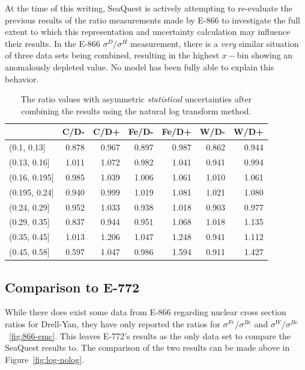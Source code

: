 At the time of this writing, SeaQuest is actively attempting to re-evaluate the previous results of the ratio measurements made by E-866 to investigate the full extent to which this representation and uncertainty calculation may influence their results. In the E-866 $\sigma^D/\sigma^H$ measurement, there is a \emph{very} similar situation of three data sets being combined, resulting in the highest $x-$bin showing an anomalously depleted value. No model has been fully able to explain this behavior.

\begin{table}
	\centering
	\begin{tabular}{lrrrrrr}
		\toprule
		{} &   C/D- &   C/D+ &  Fe/D- &  Fe/D+ &   W/D- &   W/D+ \\
		\midrule
		(0.1, 0.13]   &  0.878 &  0.967 &  0.897 &  0.987 &  0.862 &  0.944 \\
		(0.13, 0.16]  &  1.011 &  1.072 &  0.982 &  1.041 &  0.941 &  0.994 \\
		(0.16, 0.195] &  0.985 &  1.039 &  1.006 &  1.061 &  1.010 &  1.061 \\
		(0.195, 0.24] &  0.940 &  0.999 &  1.019 &  1.081 &  1.021 &  1.080 \\
		(0.24, 0.29]  &  0.952 &  1.033 &  0.938 &  1.018 &  0.903 &  0.977 \\
		(0.29, 0.35]  &  0.837 &  0.944 &  0.951 &  1.068 &  1.018 &  1.135 \\
		(0.35, 0.45]  &  1.013 &  1.206 &  1.047 &  1.248 &  0.941 &  1.112 \\
		(0.45, 0.58]  &  0.597 &  1.047 &  0.986 &  1.594 &  0.911 &  1.427 \\
		\bottomrule
	\end{tabular}
	\caption{The ratio values with asymmetric \emph{statistical} uncertainties after combining the results using the natural log transform method.}
	\label{tab:log-combined}
\end{table}

\subsection{Comparison to E-772    }

While there does exist some data from E-866 regarding nuclear cross section ratios for Drell-Yan, they have only reported the ratios for $\sigma^{Fe}/\sigma^{Be}$ and $\sigma^{W}/\sigma^{Be}$~\ref{fig:866-emc}. This leaves E-772's results as the only data set to compare the SeaQuest results to. The comparison of the two results can be made above in Figure~\ref{fig:log-nolog}.

